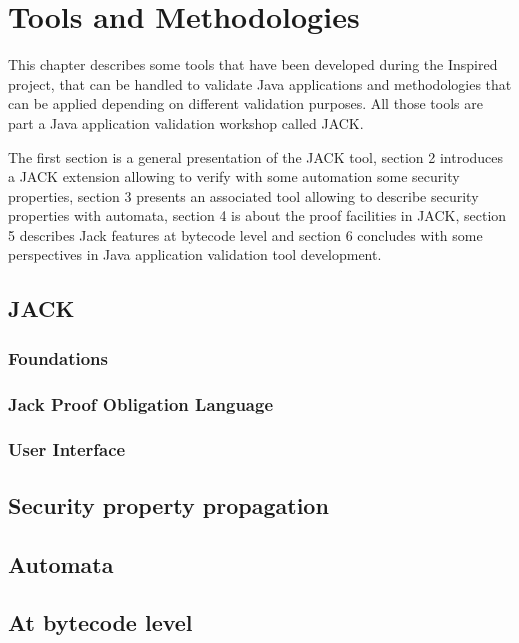 \chapter{Tools and Methodologies}
This chapter describes some tools that have been developed during the Inspired project, that can be handled to validate Java applications and methodologies that can be applied depending on different validation purposes.
All those tools are part a Java application validation workshop called JACK.

The first section is a general presentation of the JACK tool, section 2 introduces a JACK extension allowing to verify with some automation some security properties, section 3 presents an associated tool allowing to describe security properties with automata, section 4 is about the proof facilities in JACK, section 5 describes Jack features at bytecode level and section 6 concludes with some perspectives in Java application validation tool development.
\section{JACK}

\subsection{Foundations}

\subsection{Jack Proof Obligation Language}

\subsection{User Interface}

%
%

\section{Security property propagation}




%
%

\section{Automata}


\section{At bytecode level}






%

%

